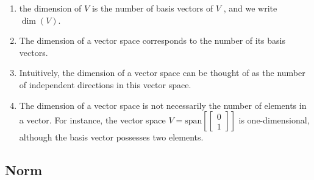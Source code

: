 \begin{enumerate}
    \item the dimension of $V$ is the number of basis vectors of $V$ , and we write $\dim(V)$.
    \hfill \cite{mfml/book/mml/Deisenroth-Faisal-Ong}

    \item The dimension of a vector space corresponds to the number of its basis vectors.
    \hfill \cite{mfml/book/mml/Deisenroth-Faisal-Ong}

    \item Intuitively, the dimension of a vector space can be thought of as the number of independent directions in this vector space.
    \hfill \cite{mfml/book/mml/Deisenroth-Faisal-Ong}

    \item The dimension of a vector space is not necessarily the number of elements in a vector. 
    For instance, the vector space $V = \text{span}[\begin{bmatrix}0 \\ 1\end{bmatrix}]$ is one-dimensional, although the basis vector possesses two elements.
    \hfill \cite{mfml/book/mml/Deisenroth-Faisal-Ong}
\end{enumerate}


\subsection{Norm}

